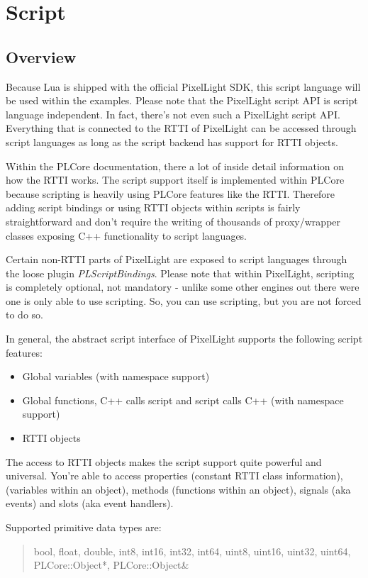 \chapter{Script}




\section{Overview}
Because Lua is shipped with the official PixelLight SDK, this script language will be used within the examples. Please note that the PixelLight script API is script language independent. In fact, there's not even such a PixelLight script API. Everything that is connected to the RTTI of PixelLight can be accessed through script languages as long as the script backend has support for RTTI objects.

Within the PLCore documentation, there a lot of inside detail information on how the RTTI works. The script support itself is implemented within PLCore because scripting is heavily using PLCore features like the RTTI. Therefore adding script bindings or using RTTI objects within scripts is fairly straightforward and don't require the writing of thousands of proxy/wrapper classes exposing C++ functionality to script languages.

Certain non-RTTI parts of PixelLight are exposed to script languages through the loose plugin \emph{PLScriptBindings}. Please note that within PixelLight, scripting is completely optional, not mandatory - unlike some other engines out there were one is only able to use scripting. So, you can use scripting, but you are not forced to do so.

In general, the abstract script interface of PixelLight supports the following script features:
\begin{itemize}
\item{Global variables (with namespace support)}
\item{Global functions, C++ calls script and script calls C++ (with namespace support)}
\item{RTTI objects}
\end{itemize}

The access to RTTI objects makes the script support quite powerful and universal. You're able to access properties (constant RTTI class information), (variables within an object), methods (functions within an object), signals (aka events) and slots (aka event handlers).

Supported primitive data types are: \begin{quote}bool, float, double, int8, int16, int32, int64, uint8, uint16, uint32, uint64, PLCore::Object*, PLCore::Object\&\end{quote}

